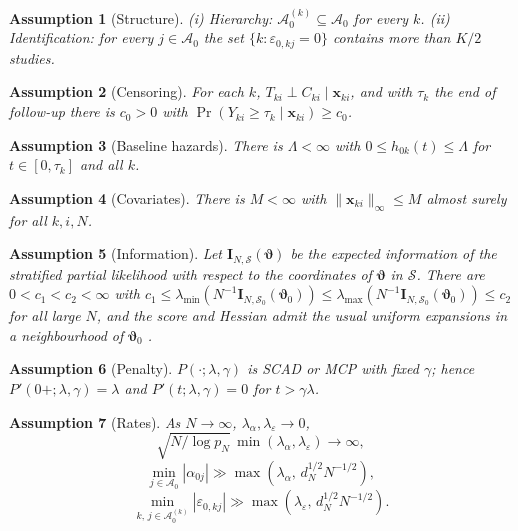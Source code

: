 \documentclass[11pt]{article}
\newtheorem{assumption}{Assumption}
\theoremstyle{remark}
\numberwithin{equation}{section}
\newcommand{\bx}{\mathbf{x}}
\newcommand{\bvt}{\boldsymbol{\vartheta}}
\begin{document}
\begin{assumption}[Structure]\label{ass:structure}
(i) Hierarchy: $\mathcal A_0^{(k)}\subseteq\mathcal A_0$ for every $k$.
(ii) Identification: for every $j\in\mathcal A_0$ the set
$\{k:\varepsilon_{0,kj}=0\}$ contains more than $K/2$ studies.
\end{assumption}

\begin{assumption}[Censoring]\label{ass:censoring}
For each $k$, $T_{ki}\perp C_{ki}\mid\bx_{ki}$, and with $\tau_k$ the end of
follow-up there is $c_0>0$ with $\Pr(Y_{ki}\ge\tau_k\mid\bx_{ki})\ge c_0$.
\end{assumption}

\begin{assumption}[Baseline hazards]\label{ass:baselinehazard}
There is $\Lambda<\infty$ with $0\le h_{0k}(t)\le\Lambda$ for $t\in[0,\tau_k]$ and all $k$.
\end{assumption}

\begin{assumption}[Covariates]\label{ass:bounded}
There is $M<\infty$ with $\|\bx_{ki}\|_\infty\le M$ almost surely for all $k,i,N$.
\end{assumption}

\begin{assumption}[Information]\label{ass:info}
Let $\mathbf I_{N,\mathcal S}(\bvt)$ be the expected information of the
stratified partial likelihood with respect to the coordinates of $\bvt$ in
$\mathcal S$. There are $0<c_1<c_2<\infty$ with
$c_1\le\lambda_{\min}(N^{-1}\mathbf I_{N,\mathcal S_0}(\bvt_0))\le
\lambda_{\max}(N^{-1}\mathbf I_{N,\mathcal S_0}(\bvt_0))\le c_2$ for all large $N$,
and the score and Hessian admit the usual uniform expansions in a neighbourhood
of $\bvt_0$ \citep{AndersenGill1982}.
\end{assumption}

\begin{assumption}[Penalty]\label{ass:penaltyshape}
$P(\cdot;\lambda,\gamma)$ is SCAD or MCP with fixed $\gamma$; hence
$P'(0+;\lambda,\gamma)=\lambda$ and $P'(t;\lambda,\gamma)=0$ for $t>\gamma\lambda$.
\end{assumption}

\begin{assumption}[Rates]\label{ass:penaltyrate}
As $N\to\infty$, $\lambda_\alpha,\lambda_\varepsilon\to0$,
\[\sqrt{N/\log p_N}\,\min(\lambda_\alpha,\lambda_\varepsilon)\to\infty,\]
\[\min_{j\in\mathcal A_0}|\alpha_{0j}|\gg\max(\lambda_\alpha,\,d_N^{1/2}N^{-1/2}),\]
\[\min_{k,\,j\in\mathcal A_0^{(k)}}|\varepsilon_{0,kj}|\gg\max(\lambda_\varepsilon,\,d_N^{1/2}N^{-1/2}).\]
\end{assumption}
\end{document}
